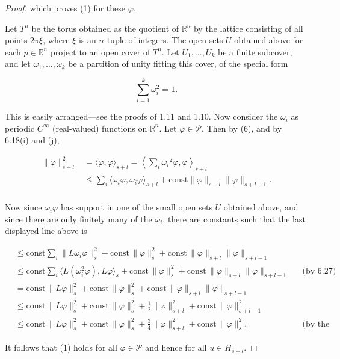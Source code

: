 \begin{proof}
which proves (1) for these $\varphi$.

Let  $ T^n $ be the torus obtained as the quotient of  $ \mathbb{R}^n $ by the lattice consisting of all points  $ 2\pi\xi $, where  $ \xi $ is an  $ n $-tuple of integers. The open sets  $ U $ obtained above for each  $ p \in \mathbb{R}^n $ project to an open cover of  $ T^n $. Let  $ U_1, \ldots, U_k $ be a finite subcover, and let  $ \omega_1, \ldots, \omega_k $ be a partition of unity fitting this cover, of the special form

\begin{equation}
\tag{6}\label{eq:6.29:6}
\sum_{i=1}^{k}\omega_{i}^{2}=1.
\end{equation}

This is easily arranged—see the proofs of 1.11 and 1.10. Now consider the  $ \omega_i $ as periodic  $ C^\infty $ (real-valued) functions on  $ \mathbb{R}^n $. Let  $ \varphi \in \mathcal{P} $. Then by (6), and by \hyperref[thm:6.18]{6.18(i)} and (j),

\[
\begin{aligned}{\|\varphi\|_{s+l}^{2}}&{{}=\langle\varphi,\varphi\rangle_{s+l}=\left\langle\sum_{i}\omega_{i}{}^{2}\varphi,\varphi\right\rangle_{s+l}}\\ {}&{{}\leq\sum_{i}\langle\omega_{i}\varphi,\omega_{i}\varphi\rangle_{s+l}+\mathrm{const}\|\varphi\|_{s+l}\|\varphi\|_{s+l-1}.}\\ \end{aligned}
\]

Now since $\omega_{i}\varphi$ has support in one of the small open sets $U$ obtained above, and since there are only finitely many of the $\omega_{i}$, there are constants such that the last displayed line above is

\[
\begin{aligned}
&\leq\mathrm{const}\sum_{i}\|L\omega_{i}\varphi\|_{s}^{2}+\mathrm{const}\,\|\varphi\|_{s}^{2}+\mathrm{const}\,\|\varphi\|_{s+l}\|\varphi\|_{s+l-1}\\
&\leq\mathrm{const}\sum_{i}\langle L(\omega_{i}^{2}\varphi),L\varphi\rangle_{s}+\mathrm{const}\,\|\varphi\|_{s}^{2}+\mathrm{const}\,\|\varphi\|_{s+l}\|\varphi\|_{s+l-1} && \text{(by 6.27)}\\
&=\mathrm{const}\,\|L\varphi\|_{s}^{2}+\mathrm{const}\,\|\varphi\|_{s}^{2}+\mathrm{const}\,\|\varphi\|_{s+l}\|\varphi\|_{s+l-1}\\
&\leq\mathrm{const}\,\|L\varphi\|_{s}^{2}+\mathrm{const}\,\|\varphi\|_{s}^{2}+\tfrac{1}{2}\|\varphi\|_{s+l}^{2}+\mathrm{const}\,\|\varphi\|_{s+l-1}^{2}\\
&\leq\mathrm{const}\,\|L\varphi\|_{s}^{2}+\mathrm{const}\,\|\varphi\|_{s}^{2}+\tfrac{3}{4}\|\varphi\|_{s+l}^{2}+\mathrm{const}\,\|\varphi\|_{s}^{2}, && \text{(by the Peter-Paul inequality).}
\end{aligned}
\]

It follows that (1) holds for all  $ \varphi \in \mathcal{P} $ and hence for all $u \in H_{s+l}$.

\end{proof}

